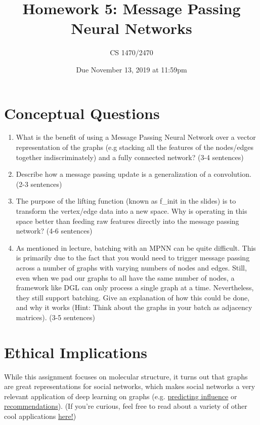 \documentclass{article}
\title{Homework 5: Message Passing Neural Networks}
\date{Due November 13, 2019 at 11:59pm}
\author{CS 1470/2470}
\begin{document}
\maketitle

\section{Conceptual Questions}
\begin{enumerate}
\item What is the benefit of using a Message Passing Neural Network over a vector representation of the graphs (e.g stacking all the features of the nodes/edges together indiscriminately) and a fully connected network? (3-4 sentences)

\item Describe how a message passing update is a generalization of a convolution. (2-3 sentences)

\item The purpose of the lifting function (known as f\_init in the slides) is to transform the vertex/edge data into a new space. Why is operating in this space better than feeding raw features directly into the message passing network? (4-6 sentences)

\item As mentioned in lecture, batching with an MPNN can be quite difficult. This is primarily due to the fact that you would need to trigger message passing across a number of graphs with varying numbers of nodes and edges. Still, even when we pad our graphs to all have the same number of nodes, a framework like DGL can only process a single graph at a time. Nevertheless, they still support batching. Give an explanation of how this could be done, and why it works (Hint: Think about the graphs in your batch as adjacency matrices). (3-5 sentences)

\end{enumerate}

\section{Ethical Implications}
While this assignment focuses on molecular structure, it turns out that graphs are great representations for social networks, which makes social networks a very relevant application of deep learning on graphs (e.g. \href{https://arxiv.org/pdf/1807.05560.pdf}{predicting influence} or \href{https://arxiv.org/pdf/1902.07243v1.pdf}{recommendations}). (If you’re curious, feel free to read about a variety of other cool applications \href{https://github.com/nnzhan/Awesome-Graph-Neural-Networks#application}{here!})\\
\end{document}
